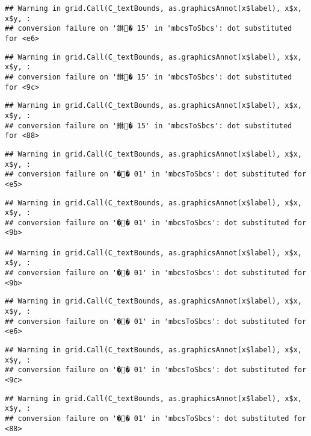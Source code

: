 \documentclass[]{article}
\begin{document}
\begin{verbatim}
## Warning in grid.Call(C_textBounds, as.graphicsAnnot(x$label), x$x, x$y, :
## conversion failure on '銝� 15' in 'mbcsToSbcs': dot substituted for <e6>
\end{verbatim}

\begin{verbatim}
## Warning in grid.Call(C_textBounds, as.graphicsAnnot(x$label), x$x, x$y, :
## conversion failure on '銝� 15' in 'mbcsToSbcs': dot substituted for <9c>
\end{verbatim}

\begin{verbatim}
## Warning in grid.Call(C_textBounds, as.graphicsAnnot(x$label), x$x, x$y, :
## conversion failure on '銝� 15' in 'mbcsToSbcs': dot substituted for <88>
\end{verbatim}

\begin{verbatim}
## Warning in grid.Call(C_textBounds, as.graphicsAnnot(x$label), x$x, x$y, :
## conversion failure on '�� 01' in 'mbcsToSbcs': dot substituted for <e5>
\end{verbatim}

\begin{verbatim}
## Warning in grid.Call(C_textBounds, as.graphicsAnnot(x$label), x$x, x$y, :
## conversion failure on '�� 01' in 'mbcsToSbcs': dot substituted for <9b>

## Warning in grid.Call(C_textBounds, as.graphicsAnnot(x$label), x$x, x$y, :
## conversion failure on '�� 01' in 'mbcsToSbcs': dot substituted for <9b>
\end{verbatim}

\begin{verbatim}
## Warning in grid.Call(C_textBounds, as.graphicsAnnot(x$label), x$x, x$y, :
## conversion failure on '�� 01' in 'mbcsToSbcs': dot substituted for <e6>
\end{verbatim}

\begin{verbatim}
## Warning in grid.Call(C_textBounds, as.graphicsAnnot(x$label), x$x, x$y, :
## conversion failure on '�� 01' in 'mbcsToSbcs': dot substituted for <9c>
\end{verbatim}

\begin{verbatim}
## Warning in grid.Call(C_textBounds, as.graphicsAnnot(x$label), x$x, x$y, :
## conversion failure on '�� 01' in 'mbcsToSbcs': dot substituted for <88>
\end{verbatim}
\end{document}
